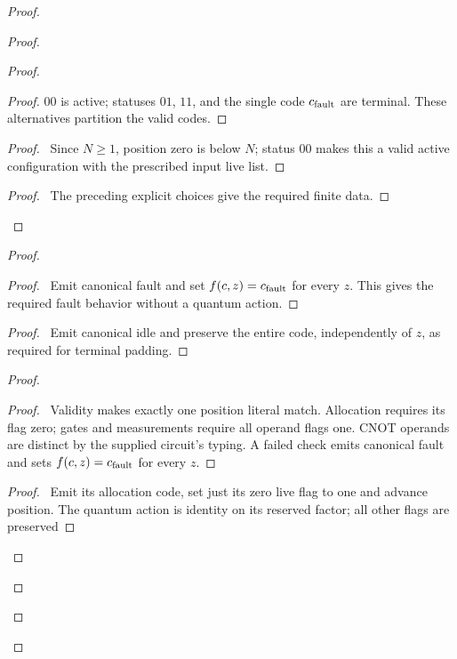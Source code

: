 \begin{proof}
\begin{proof}
\begin{proof}
\begin{proof}
  $00$ is active; statuses $01$, $11$, and the single code
  $c_{\rm fault}$ are terminal. These alternatives partition the
  valid codes.\end{proof}
  \begin{proof}\pf\ Since $N\geq1$, position zero is below $N$;
  status $00$ makes this a valid active configuration with the
  prescribed input live list.\end{proof}
  \qedstep
  \begin{proof}\pf\ The preceding explicit choices give the
  required finite data.\end{proof}
 \end{proof}
 \begin{proof}
  \begin{proof}\pf\ Emit canonical fault and set $f(c,z)=c_{\rm fault}$
  for every $z$. This gives the required fault behavior without
  a quantum action.\end{proof}
  \begin{proof}\pf\ Emit canonical idle and preserve the entire
  code, independently of $z$, as required for terminal padding.\end{proof}
  \begin{proof}
   \begin{proof}\pf\ Validity makes exactly one position literal
   match. Allocation requires its flag zero; gates and measurements
   require all operand flags one. CNOT operands are distinct by the
   supplied circuit's typing. A failed check emits canonical fault
   and sets $f(c,z)=c_{\rm fault}$ for every $z$.\end{proof}
   \begin{proof}\pf\ Emit its allocation code, set just its zero
   live flag to one and advance position. The quantum action is
   identity on its reserved factor; all other flags are preserved

\end{proof}
\end{proof}
\end{proof}
\end{proof}
\end{proof}
